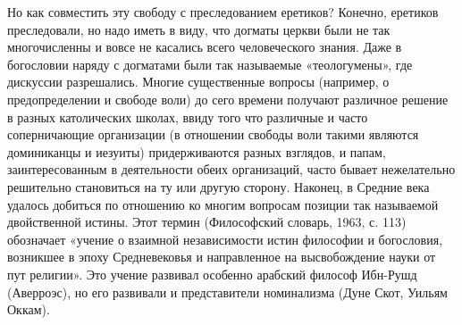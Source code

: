 Но  как совместить  эту  свободу с  преследованием еретиков?  Конечно,
еретиков  преследовали,  но надо  иметь  в  виду, что  догматы  церкви
были  не так  многочисленны и  вовсе не  касались всего  человеческого
знания.  Даже в  богословии  наряду с  догматами  были так  называемые
«теологумены», где дискуссии  разрешались. Многие существенные вопросы
(например, о предопределении и свободе  воли) до сего времени получают
различное  решение  в  разных  католических  школах,  ввиду  того  что
различные  и  часто  соперничающие организации  (в  отношении  свободы
воли  такими являются  доминиканцы  и  иезуиты) придерживаются  разных
взглядов, и папам, заинтересованным  в деятельности обеих организаций,
часто  бывает нежелательно  решительно  становиться на  ту или  другую
сторону.  Наконец, в  Средние века  удалось добиться  по отношению  ко
многим  вопросам  позиции  так называемой  двойственной  истины.  Этот
термин  (Философский  словарь,  1963,  с. 113)  обозначает  «учение  о
взаимной независимости истин философии и богословия, возникшее в эпоху
Средневековья и  направленное на высвобождение науки  от пут религии».
Это учение развивал особенно  арабский философ Ибн-Рушд (Аверроэс), но
его развивали и представители номинализма (Дуне Скот, Уильям Оккам).

